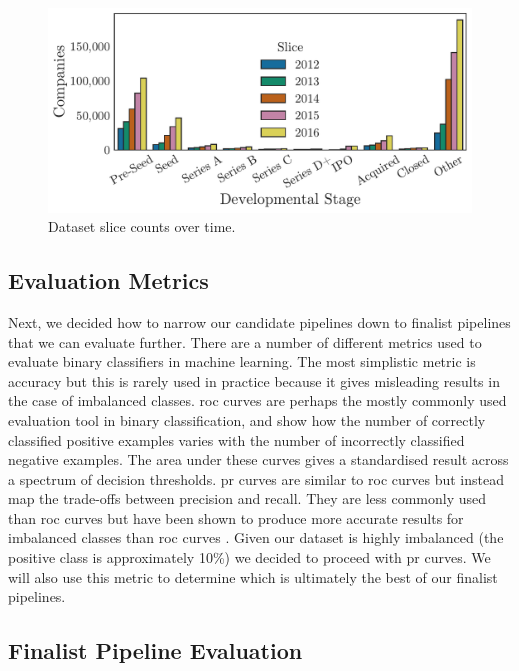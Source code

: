 \documentclass[../thesis/thesis.tex]{subfiles}
\begin{document}
\begin{figure}[!htb]
    \centering
    \includegraphics[width=\textwidth]{../figures/design/slice_counts_over_time}
    \caption[Dataset counts over time]{Dataset slice counts over time.}
    \label{fig:design:slice_counts_over_time}
\end{figure}

\subsection{Evaluation Metrics}

Next, we decided how to narrow our candidate pipelines down to finalist pipelines that we can evaluate further. There are a number of different metrics used to evaluate binary classifiers in machine learning. The most simplistic metric is accuracy but this is rarely used in practice because it gives misleading results in the case of imbalanced classes. \Gls{roc} curves are perhaps the mostly commonly used evaluation tool in binary classification, and show how the number of correctly classified positive examples varies with the number of incorrectly classified negative examples. The area under these curves gives a standardised result across a spectrum of decision thresholds. \Gls{pr} curves are similar to \gls{roc} curves but instead map the trade-offs between precision and recall. They are less commonly used than \gls{roc} curves but have been shown to produce more accurate results for imbalanced classes than \gls{roc} curves \cite{davis2006}. Given our dataset is highly imbalanced (the positive class is approximately 10\%) we decided to proceed with \gls{pr} curves. We will also use this metric to determine which is ultimately the best of our finalist pipelines.

\subsection{Finalist Pipeline Evaluation}
\end{document}
